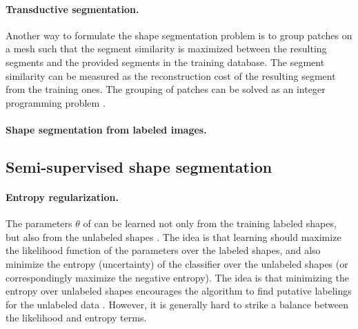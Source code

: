\paragraph*{Transductive segmentation.} Another way to formulate the shape segmentation problem is to group patches on a mesh such that the segment similarity is maximized between the resulting segments and the provided segments in the training database. The segment similarity can be measured as the reconstruction cost of the resulting segment from the training ones. The grouping of patches can be solved as an integer programming problem \cite{Xu:2014:TSS}.

\paragraph*{Shape segmentation from labeled images.} 


\subsection{Semi-supervised shape segmentation}

\paragraph*{Entropy regularization.} The parameters $\theta$ of  can be learned not only from the training labeled shapes, but also from the unlabeled shapes \cite{Lv:2012:SMS}. The idea is that learning should maximize the likelihood function of the parameters over the labeled shapes, and also minimize the entropy (uncertainty) of the classifier over the unlabeled shapes (or correspondingly maximize the negative entropy). The idea is that minimizing the entropy over unlabeled shapes encourages the algorithm to find putative labelings for the unlabeled data \cite{Jiao:2006:SCR}. However, it is generally hard to strike a balance between the likelihood and entropy terms.

